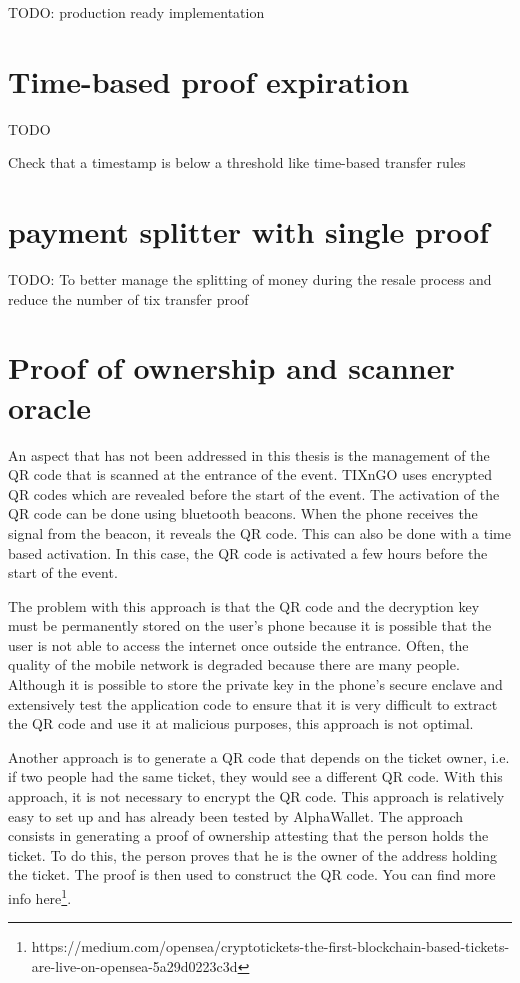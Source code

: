 \documentclass[a4paper,11pt,oneside]{report}
\begin{document}
TODO: production ready implementation

\section{Time-based proof expiration}
TODO

Check that a timestamp is below a threshold like time-based transfer rules

\section{payment splitter with single proof}
TODO: To better manage the splitting of money during the resale process and reduce the number of tix transfer proof

\section{Proof of ownership and scanner oracle}
An aspect that has not been addressed in this thesis is the management of the QR code that is scanned at the entrance of the event. TIXnGO uses encrypted QR codes which are revealed before the start of the event. The activation of the QR code can be done using bluetooth beacons. When the phone receives the signal from the beacon, it reveals the QR code. This can also be done with a time based activation. In this case, the QR code is activated a few hours before the start of the event.

The problem with this approach is that the QR code and the decryption key must be permanently stored on the user's phone because it is possible that the user is not able to access the internet once outside the entrance. Often, the quality of the mobile network is degraded because there are many people. Although it is possible to store the private key in the phone's secure enclave and extensively test the application code to ensure that it is very difficult to extract the QR code and use it at malicious purposes, this approach is not optimal.

Another approach is to generate a QR code that depends on the ticket owner, i.e. if two people had the same ticket, they would see a different QR code. With this approach, it is not necessary to encrypt the QR code. This approach is relatively easy to set up and has already been tested by AlphaWallet. The approach consists in generating a proof of ownership attesting that the person holds the ticket. To do this, the person proves that he is the owner of the address holding the ticket. The proof is then used to construct the QR code. You can find more info here\footnote{https://medium.com/opensea/cryptotickets-the-first-blockchain-based-tickets-are-live-on-opensea-5a29d0223c3d}.
\end{document}
